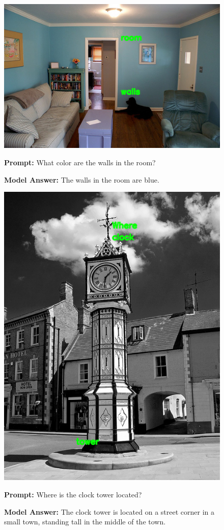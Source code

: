 \documentclass[11pt]{article}
\begin{document}
\begin{figure}[H]
    \centering
    \includegraphics[width=0.6\linewidth]{iclr2026/reordering_179.png}\par
    \vspace{1em}
    \raggedright
    \textbf{Prompt:} What color are the walls in the room?
    
    \textbf{Model Answer:} The walls in the room are blue.
\end{figure}

\begin{figure}[H]
    \centering
    \includegraphics[width=0.6\linewidth]{iclr2026/reordering_178.png}\par
    \vspace{1em}
    \raggedright
    \textbf{Prompt:} Where is the clock tower located?
    
    \textbf{Model Answer:} The clock tower is located on a street corner in a small town, standing tall in the middle of the town.
\end{figure}
\end{document}
